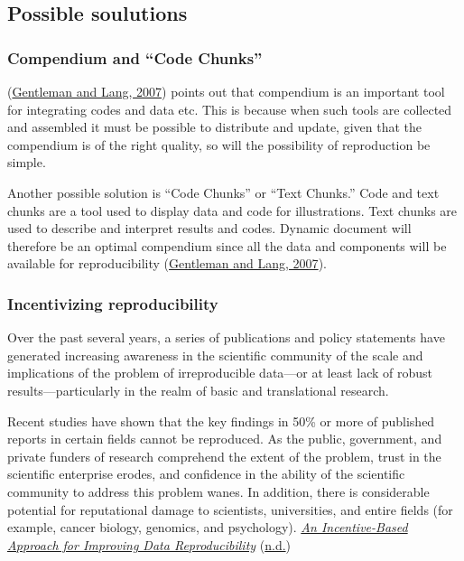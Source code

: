 \documentclass[
  12pt,
]{article}
\begin{document}
\hypertarget{possible-soulutions}{%
\subsection{Possible soulutions}\label{possible-soulutions}}

\hypertarget{compendium-and-code-chunks}{%
\subsubsection{Compendium and ``Code
Chunks''}\label{compendium-and-code-chunks}}

(\protect\hyperlink{ref-gentleman2007}{Gentleman and Lang, 2007}) points
out that compendium is an important tool for integrating codes and data
etc. This is because when such tools are collected and assembled it must
be possible to distribute and update, given that the compendium is of
the right quality, so will the possibility of reproduction be simple.

Another possible solution is ``Code Chunks'' or ``Text Chunks.'' Code
and text chunks are a tool used to display data and code for
illustrations. Text chunks are used to describe and interpret results
and codes. Dynamic document will therefore be an optimal compendium
since all the data and components will be available for reproducibility
(\protect\hyperlink{ref-gentleman2007}{Gentleman and Lang, 2007}).

\hypertarget{incentivizing-reproducibility}{%
\subsubsection{Incentivizing
reproducibility}\label{incentivizing-reproducibility}}

Over the past several years, a series of publications and policy
statements have generated increasing awareness in the scientific
community of the scale and implications of the problem of irreproducible
data---or at least lack of robust results---particularly in the realm of
basic and translational research.

Recent studies have shown that the key findings in 50\% or more of
published reports in certain fields cannot be reproduced. As the public,
government, and private funders of research comprehend the extent of the
problem, trust in the scientific enterprise erodes, and confidence in
the ability of the scientific community to address this problem wanes.
In addition, there is considerable potential for reputational damage to
scientists, universities, and entire fields (for example, cancer
biology, genomics, and psychology).
\protect\hyperlink{ref-Science.org}{\emph{An Incentive-Based Approach
for Improving Data Reproducibility}}
(\protect\hyperlink{ref-Science.org}{n.d.})
\end{document}
